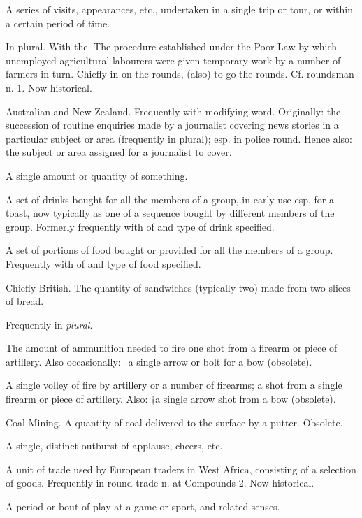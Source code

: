 \begin{compactitem}
			\item[V.26.c] A series of visits, appearances, etc., undertaken in a single trip or tour, or within a certain period of time.
			\item[V.27] In plural. With the. The procedure established under the Poor Law by which unemployed agricultural labourers were given temporary work by a number of farmers in turn. Chiefly in on the rounds, (also) to go the rounds. Cf. roundsman n. 1. Now historical.
			\item[V.28] Australian and New Zealand. Frequently with modifying word. Originally: the succession of routine enquiries made by a journalist covering news stories in a particular subject or area (frequently in plural); esp. in police round. Hence also: the subject or area assigned for a journalist to cover. 
			\item[VI] A single amount or quantity of something.
			\item[VI.29.a] A set of drinks bought for all the members of a group, in early use esp. for a toast, now typically as one of a sequence bought by different members of the group. Formerly frequently with of and type of drink specified.
			\item[VI.29.b] A set of portions of food bought or provided for all the members of a group. Frequently with of and type of food specified.
			\item[VI.29.c] Chiefly British. The quantity of sandwiches (typically two) made from two slices of bread.
			\item[VI.30] Frequently in \textit{plural}.
			\item[VI.30.a] The amount of ammunition needed to fire one shot from a firearm or piece of artillery. Also occasionally: †a single arrow or bolt for a bow (obsolete).
			\item[VI.30.b] A single volley of fire by artillery or a number of firearms; a shot from a single firearm or piece of artillery. Also: †a single arrow shot from a bow (obsolete). 
			\item[VI.31] Coal Mining. A quantity of coal delivered to the surface by a putter. Obsolete.
			\item[VI.32] A single, distinct outburst of applause, cheers, etc.
			\item[VI.33] A unit of trade used by European traders in West Africa, consisting of a selection of goods. Frequently in round trade n. at Compounds 2. Now historical.
			\item[VII] A period or bout of play at a game or sport, and related senses.

\end{compactitem}
